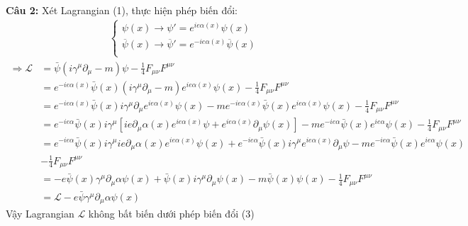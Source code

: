 \documentclass{article}
\begin{document}
\textbf{Câu 2:} Xét Lagrangian (1), thực hiện phép biến đổi:
\begin{align}
	\begin{cases}
		\psi(x)\rightarrow\psi'=e^{ie\alpha(x)}\psi(x)                                   \\
		\overline{\psi}(x)\rightarrow\overline{\psi}'=e^{-ie\alpha(x)}\overline{\psi}(x) \\
	\end{cases}
\end{align}
\begin{align*}
	\Rightarrow
	\mathcal{L} & =\bar{\psi}(i\gamma^\mu\partial_\mu-m)\psi-\frac{1}{4}F_{\mu\nu}F^{\mu\nu}                                                                                                                                       \\
	            & =e^{-ie\alpha(x)}\bar{\psi}(x)(i\gamma^\mu\partial_\mu-m)e^{ie\alpha(x)}\psi(x)-\frac{1}{4}F_{\mu\nu}F^{\mu\nu}                                                                                                  \\
	            & =e^{-ie\alpha(x)}\bar{\psi}(x)i\gamma^\mu\partial_\mu e^{ie\alpha(x)}\psi(x)-me^{-ie\alpha(x)}\bar{\psi}(x)e^{ie\alpha(x)}\psi(x)-\frac{1}{4}F_{\mu\nu}F^{\mu\nu}                                                \\
	            & =e^{-ie\alpha}\bar{\psi}(x)i\gamma^\mu \left[ie\partial_\mu\alpha(x)e^{ie\alpha(x)}\psi+e^{ie\alpha(x)}\partial_\mu\psi(x)\right]-me^{-ie\alpha}\bar{\psi}(x)e^{ie\alpha}\psi(x)-\frac{1}{4}F_{\mu\nu}F^{\mu\nu} \\
	            & =e^{-ie\alpha}\bar{\psi}(x)i\gamma^\mu ie\partial_\mu\alpha(x)e^{ie\alpha(x)}\psi(x)+e^{-ie\alpha}\bar{\psi}(x)i\gamma^\mu e^{ie\alpha(x)}\partial_\mu\psi-me^{-ie\alpha}\bar{\psi}(x)e^{ie\alpha}\psi(x)        \\
	            & -\frac{1}{4}F_{\mu\nu}F^{\mu\nu}                                                                                                                                                                                 \\
	            & =-e\bar{\psi}(x)\gamma^\mu\partial_\mu\alpha\psi(x)+\bar{\psi}(x)i\gamma^\mu\partial_\mu\psi(x)-m\bar{\psi}(x)\psi(x)-\frac{1}{4}F_{\mu\nu}F^{\mu\nu}                                                            \\
	            & =\mathcal{L}-e\bar{\psi}\gamma^\mu\partial_\mu\alpha\psi(x)
\end{align*}
Vậy Lagrangian $\mathcal{L}$ không bất biến dưới phép biến đổi (3)
\end{document}
